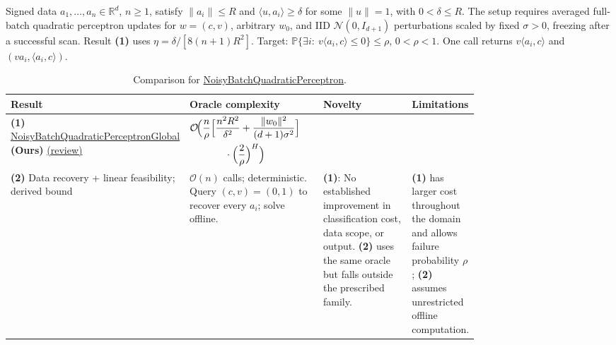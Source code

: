 \begin{table}[tp]
\centering
\caption{Comparison for \href{https://github.com/k3nfalt/longtails/blob/main/LongTails/Setups/NoisyBatchQuadraticPerceptron.lean}{NoisyBatchQuadraticPerceptron}.}\label{tab:NoisyBatchQuadraticPerceptron}
\parbox{\linewidth}{\footnotesize Signed data $a_1,\ldots,a_n\in\mathbb R^d$, $n\ge1$, satisfy $\|a_i\|\le R$ and $\langle u,a_i\rangle\ge\delta$ for some $\|u\|=1$, with $0<\delta\le R$. The setup requires averaged full-batch quadratic perceptron updates for $w=(c,v)$, arbitrary $w_0$, and IID $\mathcal N(0,I_{d+1})$ perturbations scaled by fixed $\sigma>0$, freezing after a successful scan. Result \textbf{(1)} uses $\eta=\delta/[8(n+1)R^2]$. Target: $\mathbb P\{\exists i:\ v\langle a_i,c\rangle\le0\}\le\rho$, $0<\rho<1$. One call returns $v\langle a_i,c\rangle$ and $(va_i,\langle a_i,c\rangle)$.}\par\smallskip
\begin{threeparttable}
\footnotesize
\setlength{\tabcolsep}{4pt}\renewcommand{\arraystretch}{1.25}
\begin{tabularx}{\linewidth}{@{}>{\raggedright\arraybackslash}p{0.20\linewidth}>{\raggedright\arraybackslash}p{0.32\linewidth}>{\raggedright\arraybackslash}p{0.25\linewidth}>{\raggedright\arraybackslash}X@{}}
\toprule
\textbf{Result} & \textbf{Oracle complexity} & \textbf{Novelty} & \textbf{Limitations} \\
\midrule
\textbf{(1)} \href{https://github.com/k3nfalt/longtails/blob/main/LongTails/Theorems/NoisyBatchQuadraticPerceptronGlobal.lean}{Noisy\allowbreak{}Batch\allowbreak{}Quadratic\allowbreak{}Perceptron\allowbreak{}Global} \textbf{(Ours)} \href{https://github.com/k3nfalt/longtails/blob/main/scripts/reviews/NoisyBatchQuadraticPerceptronGlobal.md}{(review)}
& $\displaystyle\begin{gathered}\mathcal{O}\!\Bigl(\frac n\rho\Bigl[\frac{n^2R^2}{\delta^2}+\frac{\|w_0\|^2}{(d+1)\sigma^2}\Bigr]\\ {}\cdot\Bigl(\frac2\rho\Bigr)^H\Bigr)\end{gathered}$ & & \\
\midrule[1.2pt]
\textbf{(2)} Data recovery + linear feasibility; derived bound \citep{nbqpOracleSource}
& $\mathcal{O}(n)$ calls; deterministic. Query $(c,v)=(0,1)$ to recover every $a_i$; solve offline.
& \textbf{(1)}: No established improvement in classification cost, data scope, or output. \textbf{(2)} uses the same oracle but falls outside the prescribed family.
& \textbf{(1)} has larger cost throughout the domain and allows failure probability $\rho$; \textbf{(2)} assumes unrestricted offline computation. \\

\end{tabularx}
\end{threeparttable}
\end{table}
